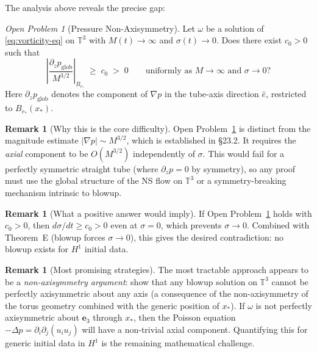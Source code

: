 \documentclass[11pt]{article}
\theoremstyle{definition}
\newtheorem{remark}[theorem]{Remark}
\theoremstyle{remark}
\newtheorem{openproblem}[theorem]{Open Problem}
\begin{document}
The analysis above reveals the precise gap:

\begin{openproblem}[Pressure Non-Axisymmetry]\label{open:pressure}
  Let $\omega$ be a solution of \eqref{eq:vorticity-eq} on $\mathbb{T}^3$ with
  $M(t)\to\infty$ and $\sigma(t)\to 0$.  Does there exist $c_0 > 0$ such that
  \[
    \left|\frac{\partial_z p_{\mathrm{glob}}}{M^{3/2}}\right|_{B_{r_*}}
    \;\ge\; c_0 \;>\; 0
    \qquad \text{uniformly as } M\to\infty\text{ and }\sigma\to 0?
  \]
  Here $\partial_z p_{\mathrm{glob}}$ denotes the component of $\nabla p$
  in the tube-axis direction $\hat{e}$, restricted to $B_{r_*}(x_*)$.
\end{openproblem}

\begin{remark}[Why this is the core difficulty]
  Open Problem~\ref{open:pressure} is distinct from the magnitude estimate
  $|\nabla p| \sim M^{3/2}$, which is established in \S23.2.  It requires the
  \emph{axial} component to be $O(M^{3/2})$ independently of $\sigma$.
  This would fail for a perfectly symmetric straight tube (where $\partial_z p = 0$
  by symmetry), so any proof must use the global structure of the NS flow on
  $\mathbb{T}^3$ or a symmetry-breaking mechanism intrinsic to blowup.
\end{remark}

\begin{remark}[What a positive answer would imply]
  If Open Problem~\ref{open:pressure} holds with $c_0 > 0$, then
  $d\sigma/dt \ge c_0 > 0$ even at $\sigma = 0$, which prevents $\sigma\to 0$.
  Combined with Theorem~E (blowup forces $\sigma\to 0$), this gives
  the desired contradiction: no blowup exists for $H^1$ initial data.
\end{remark}

\begin{remark}[Most promising strategies]
  The most tractable approach appears to be a \emph{non-axisymmetry argument}:
  show that any blowup solution on $\mathbb{T}^3$ cannot be perfectly axisymmetric
  about any axis (a consequence of the non-axisymmetry of the torus geometry
  combined with the generic position of $x_*$).  If $\omega$ is not perfectly
  axisymmetric about $\mathbf{e}_3$ through $x_*$, then the Poisson equation
  $-\Delta p = \partial_i\partial_j(u_i u_j)$ will have a non-trivial
  axial component.  Quantifying this for generic initial data in $H^1$
  is the remaining mathematical challenge.
\end{remark}
\end{document}
